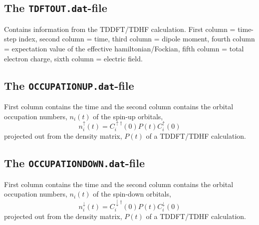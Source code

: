 \documentclass[a4paper,twoside,openany]{book}
\begin{document}
{{\subsection{The \texttt{TDFTOUT.dat}-file}
Contains information from the TDDFT/TDHF  calculation. First column = time-step index, second column = time, third column = dipole moment, fourth column = expectation value of the effective hamiltonian/Fockian, 
fifth column = total electron  charge, sixth column = electric field.

\subsection{The \texttt{OCCUPATIONUP.dat}-file}
First column contains the time and the second column contains the orbital occupation numbers, $n_{i}(t)$ of the spin-up orbitals, 
\begin{equation}
n^{\uparrow}_{i}(t) = C_{i}^{\uparrow \dagger}(0)P(t)C_{i}^{\uparrow}(0)
\end{equation}
projected out from the density matrix, $P(t)$ of a TDDFT/TDHF calculation.

\subsection{The \texttt{OCCUPATIONDOWN.dat}-file}
First column contains the time and the second column contains the orbital occupation numbers, $n_{i}(t)$ of the spin-down orbitals, 
\begin{equation}
n^{\downarrow }_{i}(t) = C_{i}^{\downarrow \dagger}(0)P(t)C_{i}^{\downarrow}(0)
\end{equation}
projected out from the density matrix, $P(t)$ of a TDDFT/TDHF calculation.

}}
\end{document}
